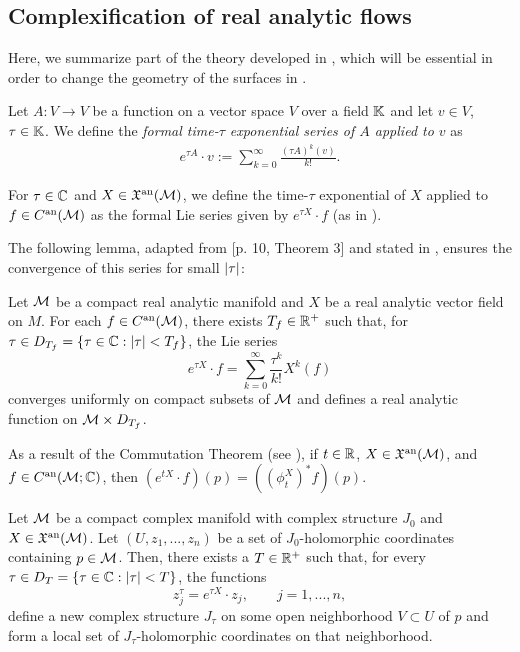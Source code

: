 \documentclass[notas.tex]{subfiles}
\begin{document}
\subsection{Complexification of real analytic flows} 
Here, we summarize part of the theory developed in \cite{mourao_complexified_2015}, which will be essential in order to change the geometry of the surfaces in .

\begin{defn} \label{def_general_lie_series}
	Let $A: V \to V$ be a function on a vector space $V$ over a field $\mathbb{K}$ and let $v \in V$, $\tau \in \mathbb{K}$. We define the \emph{formal time-$\tau$ exponential series of $A$ applied to $v$} as 
	\begin{align} \label{eq_general_lie_series}
		e^{\tau A}\cdot v := \sum_{k=0}^{\infty}\frac{(\tau A)^k(v)}{k!}.
	\end{align}
\end{defn}

\begin{defn}\label{def_lie_series}
	For $\tau \in \mathbb{C}$ and $X \in \mathfrak{X}^{\text{an}}(\mathcal{M})$, we define the time-$\tau$ exponential of $X$ applied to $f \in C^{\text{an}}(\mathcal{M})$ as the formal Lie series given by $e^{\tau X} \cdot f$ (as in ).
\end{defn}

The following lemma, adapted from \cite{groebner_general_1967}[p. 10, Theorem 3] and stated in \cite{mourao_complexified_2015}, ensures the convergence of this series for small $\left|\tau\right|$:
\begin{lem} \label{lem_lie_series}
Let $\mathcal{M}$ be a compact real analytic manifold and $X$ be a real analytic vector field on $M$. For each $f \in C^{\text{an}}(\mathcal{M})$, there exists $T_f \in \mathbb{R}^+$ such that, for $\tau \in D_{T_f} = \{\tau \in \mathbb{C}: \left|\tau\right| < T_f\}$, the Lie series
\[
e^{\tau X} \cdot f = \sum_{k=0}^\infty \frac{\tau^k}{k!}X^k(f)
\]
converges uniformly on compact subsets of $\mathcal{M}$ and defines a real analytic function on $\mathcal{M} \times D_{T_f}$.
\end{lem} 

\begin{rem}
	As a result of the Commutation Theorem (see \cite[p.17, Theorem 6]{groebner_general_1967}), if $t \in \mathbb{R}$, $X \in \mathfrak{X}^{\text{an}}(\mathcal{M})$, and $f \in C^{\text{an}}(\mathcal{M}; \mathbb{C})$, then $(e^{t X} \cdot f)  (p)= ((\phi^X_t)^* f) (p)$.
\end{rem}

\begin{thm} \label{thm_coordinate_evolution}
Let $\mathcal{M}$ be a compact complex manifold with complex structure $J_0$ and $X \in \mathfrak{X}^{\text{an}}(\mathcal{M})$. Let $(U, z_1,...,z_n)$ be a set of $J_0$-holomorphic coordinates containing $p \in \mathcal{M}$. Then, there exists a $T \in \mathbb{R}^+$ such that, for every $\tau \in D_T = \{\tau \in \mathbb{C} : \left|\tau\right| < T\}$, the functions
\[z_j^\tau = e^{\tau X} \cdot z_j, \qquad j = 1,...,n,\]
define a new complex structure $J_\tau$ on some open neighborhood $V \subset U$ of $p$ and form a local set of $J_\tau$-holomorphic coordinates on that neighborhood.
\end{thm}
\end{document}
